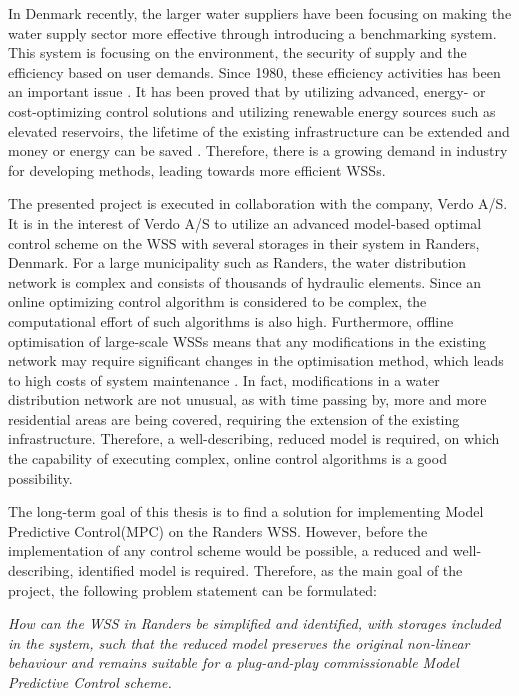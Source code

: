 In Denmark recently, the larger water suppliers have been focusing on making the water supply sector more effective through introducing a benchmarking system. This system is focusing on the environment, the security of supply and the efficiency based on user demands. Since 1980, these efficiency activities has been an important issue \cite{water_denmark}. It has been proved that by utilizing advanced, energy- or cost-optimizing control solutions and utilizing renewable energy sources such as elevated reservoirs, the lifetime of the existing infrastructure can be extended and money or energy can be saved \cite{sustainable_water}. Therefore, there is a growing demand in industry for developing methods, leading towards more efficient WSSs. 

The presented project is executed in collaboration with the company, Verdo A/S. It is in the interest of Verdo A/S to utilize an advanced model-based optimal control scheme on the WSS with several storages in their system in Randers, Denmark. For a large municipality such as Randers, the water distribution network is complex and consists of thousands of hydraulic elements. Since an online optimizing control algorithm is considered to be complex, the computational effort of such algorithms is also high. Furthermore, offline optimisation of large-scale WSSs means that any modifications in the existing network may require significant changes in the optimisation method, which leads to high costs of system maintenance \cite{brdys1994operational}. In fact, modifications in a water distribution network are not unusual, as with time passing by, more and more residential areas are being covered, requiring the extension of the existing infrastructure. Therefore, a well-describing, reduced model is required, on which the capability of executing complex, online control algorithms is a good possibility. 

The long-term goal of this thesis is to find a solution for implementing Model Predictive Control(MPC) on the Randers WSS. However, before the implementation of any control scheme would be possible, a reduced and well-describing, identified model is required. Therefore, as the main goal of the project, the following problem statement can be formulated: 

\emph{How can the WSS in Randers be simplified and identified, with storages included in the system, such that the reduced model preserves the original non-linear behaviour and remains suitable for a plug-and-play commissionable Model Predictive Control scheme.}









